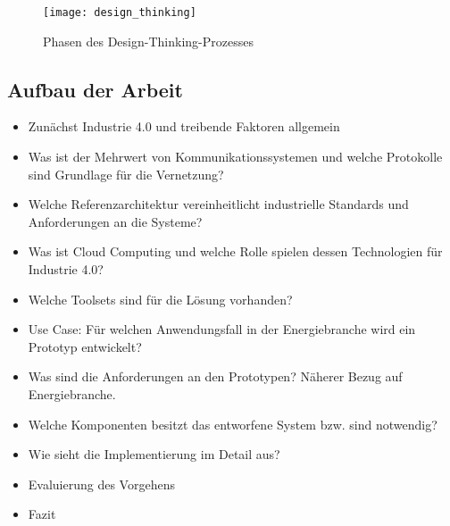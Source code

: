 \begin{figure}[ht]
  \centering
  \texttt{[image: design\_thinking]}
  \caption[Phasen des Design-Thinking-Prozesses]{Phasen des Design-Thinking-Prozesses \citep[S. 69]{Elsner2018}}
  \label{}
\end{figure}

\subsection{Aufbau der Arbeit}

\begin{itemize}
  \item Zunächst Industrie 4.0 und treibende Faktoren allgemein
  \item Was ist der Mehrwert von Kommunikationssystemen und welche Protokolle sind Grundlage für die Vernetzung?
  \item Welche Referenzarchitektur vereinheitlicht industrielle Standards und Anforderungen an die Systeme?
  \item Was ist Cloud Computing und welche Rolle spielen dessen Technologien für Industrie 4.0?
  \item Welche Toolsets sind für die Lösung vorhanden?
  \item Use Case: Für welchen Anwendungsfall in der Energiebranche wird ein Prototyp entwickelt?
  \item Was sind die Anforderungen an den Prototypen? Näherer Bezug auf Energiebranche.
  \item Welche Komponenten besitzt das entworfene System bzw. sind notwendig?
  \item Wie sieht die Implementierung im Detail aus?
  \item Evaluierung des Vorgehens
  \item Fazit
\end{itemize}



\newpage
